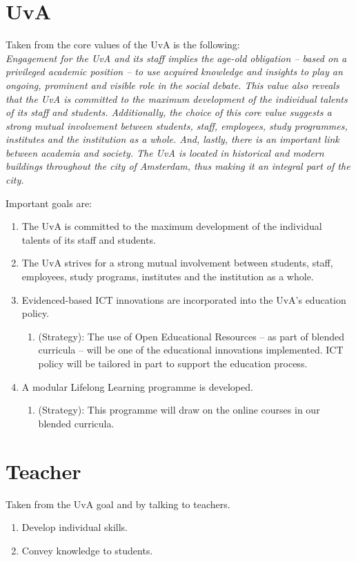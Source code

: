 \section{UvA}
Taken from the core values of the UvA is the following: \\
\textit{Engagement for the UvA and its staff implies the age-old obligation – based on a privileged academic position – to use acquired knowledge and insights to play an ongoing, prominent and visible role in the social debate. This value also reveals that the UvA is committed to the maximum development of the individual talents of its staff and students. Additionally, the choice of this core value suggests a strong mutual involvement between students, staff, employees, study programmes, institutes and the institution as a whole. And, lastly, there is an important link between academia and society. The UvA is located in historical and modern buildings throughout the city of Amsterdam, thus making it an integral part of the city.}

Important goals are:
\begin{enumerate}
	\item The UvA is committed to the maximum development of the individual talents of its staff and students.\cite{uva_mission}
	\item The UvA strives for a strong mutual involvement between students, staff, employees, study programs, institutes and the institution as a whole.\cite{uva_mission}
	\item Evidenced-based ICT innovations are incorporated into the UvA’s education policy.\cite{uva_plan} \begin{enumerate}
		\item (Strategy): The use of Open Educational Resources – as part of blended curricula – will be one of the educational innovations implemented. ICT policy will be tailored in part to support the education process. 
	\end{enumerate}
	\item A modular Lifelong Learning programme is developed.\cite{uva_plan} \begin{enumerate}
		\item (Strategy): This programme will draw on the online
		courses in our blended curricula. 
	\end{enumerate}
\end{enumerate}

\section{Teacher}
Taken from the UvA goal and by talking to teachers.
\begin{enumerate}
	\item Develop individual skills.
	\item Convey knowledge to students.
\end{enumerate}

